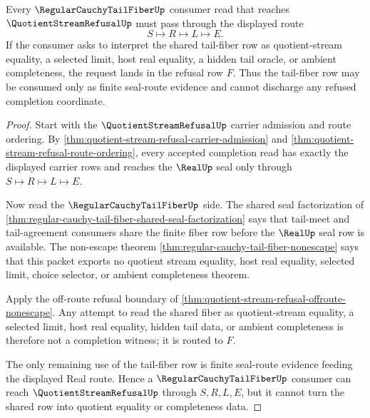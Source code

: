 \begin{theorem}
\label{thm:quotient-stream-refusal-tail-fiber-boundary}
Every $\RegularCauchyTailFiberUp$ consumer read that reaches $\QuotientStreamRefusalUp$ must pass through the displayed route
$$
S \longmapsto R \longmapsto L \longmapsto E.
$$
If the consumer asks to interpret the shared tail-fiber row as quotient-stream equality, a selected limit, host real equality, a hidden tail oracle, or ambient completeness, the request lands in the refusal row $F$. Thus the tail-fiber row may be consumed only as finite seal-route evidence and cannot discharge any refused completion coordinate.
\end{theorem}
\begin{proof}
Start with the $\QuotientStreamRefusalUp$ carrier admission and route ordering. By \autoref{thm:quotient-stream-refusal-carrier-admission} and \autoref{thm:quotient-stream-refusal-route-ordering}, every accepted completion read has exactly the displayed carrier rows and reaches the $\RealUp$ seal only through $S \longmapsto R \longmapsto L \longmapsto E$.

Now read the $\RegularCauchyTailFiberUp$ side. The shared seal factorization of \autoref{thm:regular-cauchy-tail-fiber-shared-seal-factorization} says that tail-meet and tail-agreement consumers share the finite fiber row before the $\RealUp$ seal row is available. The non-escape theorem \autoref{thm:regular-cauchy-tail-fiber-nonescape} says that this packet exports no quotient stream equality, host real equality, selected limit, choice selector, or ambient completeness theorem.

Apply the off-route refusal boundary of \autoref{thm:quotient-stream-refusal-offroute-nonescape}. Any attempt to read the shared fiber as quotient-stream equality, a selected limit, host real equality, hidden tail data, or ambient completeness is therefore not a completion witness; it is routed to $F$.

The only remaining use of the tail-fiber row is finite seal-route evidence feeding the displayed Real route. Hence a $\RegularCauchyTailFiberUp$ consumer can reach $\QuotientStreamRefusalUp$ through $S,R,L,E$, but it cannot turn the shared row into quotient equality or completeness data.
\end{proof}

